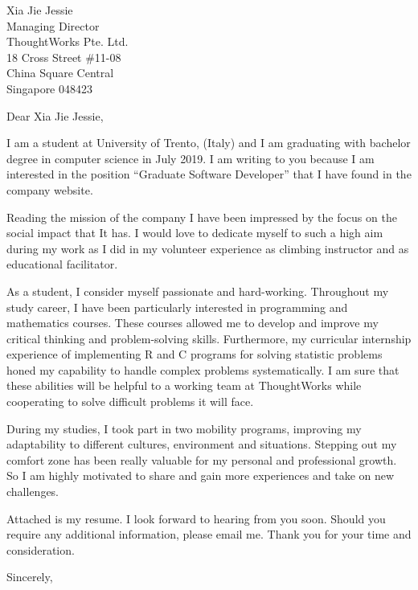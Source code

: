 \documentclass[a4paper]{letter}
\begin{document}
\begin{letter}{
    Xia Jie Jessie \\
    Managing Director\\
    ThoughtWorks Pte. Ltd.\\
    18 Cross Street \#11-08\\
    China Square Central\\
    Singapore 048423}

\opening{Dear Xia Jie Jessie,}
I am a student at University of Trento, (Italy) and I am graduating with bachelor degree in computer science in July 2019. I am writing to you because I am interested in the position ``Graduate Software Developer'' that I have found in the company website.

Reading the mission of the company I have been impressed by the focus on the social impact that It has. I would love to dedicate myself to such a high aim during my work as I did in my volunteer experience as climbing instructor and as educational facilitator.

As a student, I consider myself passionate and hard-working. Throughout my study career, I have been particularly interested in programming and mathematics courses. These courses allowed me to develop and improve my critical thinking and problem-solving skills. Furthermore, my curricular internship experience of implementing R and C programs for solving statistic problems honed my capability to handle complex problems systematically. I am sure that these abilities will be helpful to a working team at ThoughtWorks while cooperating to solve difficult problems it will face.

During my studies, I took part in two mobility programs, improving my adaptability to different cultures, environment and situations. Stepping out my comfort zone has been really valuable for my personal and professional growth. So I am highly motivated to share and gain more experiences and take on new challenges.

Attached is my resume. I look forward to hearing from you soon.
Should you require any additional information, please email me.
Thank you for your time and consideration.
\closing{Sincerely,}
\end{letter}
\end{document}
